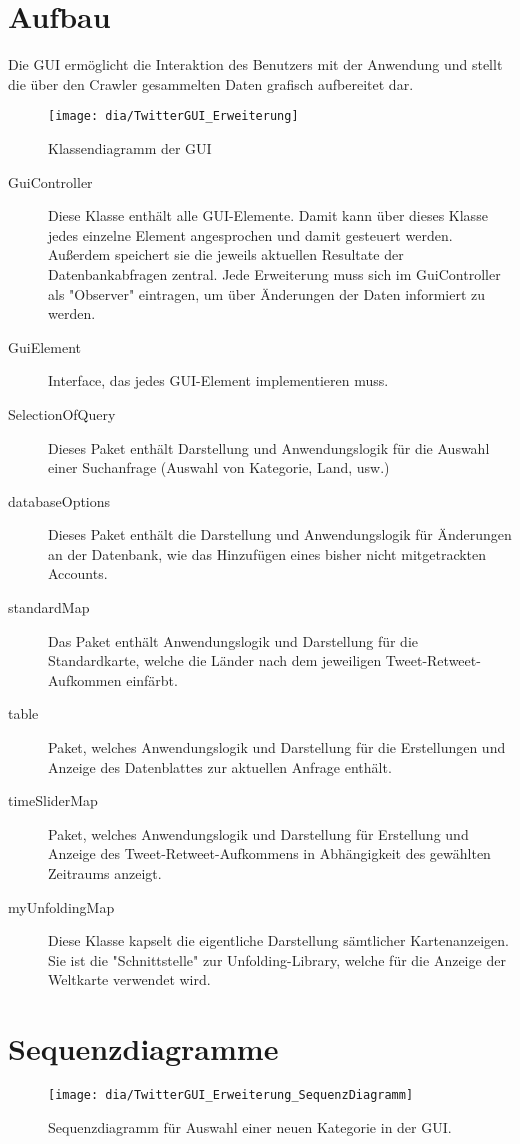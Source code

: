 \section{Aufbau}
Die GUI ermöglicht die Interaktion des Benutzers mit der Anwendung und stellt die über den Crawler gesammelten Daten grafisch aufbereitet dar. 
\begin{figure}[h!]
	\centering
	\texttt{[image: dia/TwitterGUI\_Erweiterung]}
	\caption{Klassendiagramm der GUI}
	\label{fig:GUI}
\end{figure}
\begin{description}
	\item[GuiController] Diese Klasse enthält alle GUI-Elemente. Damit kann über dieses Klasse jedes einzelne Element angesprochen und damit gesteuert werden. Außerdem speichert sie die jeweils aktuellen Resultate der Datenbankabfragen zentral. Jede Erweiterung muss sich im GuiController als "Observer" eintragen, um über Änderungen der Daten informiert zu werden. 
	\item[GuiElement] Interface, das jedes GUI-Element implementieren muss.
	\item [SelectionOfQuery] Dieses Paket enthält Darstellung und Anwendungslogik für die Auswahl einer Suchanfrage (Auswahl von Kategorie, Land, usw.)
	\item[databaseOptions] Dieses Paket enthält die Darstellung und Anwendungslogik für Änderungen an der Datenbank, wie das Hinzufügen eines bisher nicht mitgetrackten Accounts.
	
	\item [standardMap] Das Paket enthält Anwendungslogik und Darstellung für die Standardkarte, welche die Länder nach dem jeweiligen Tweet-Retweet-Aufkommen einfärbt.
	\item [table] Paket, welches Anwendungslogik und Darstellung für die Erstellungen und Anzeige des Datenblattes zur aktuellen Anfrage enthält.
	\item [timeSliderMap] Paket, welches Anwendungslogik und Darstellung für Erstellung und Anzeige des Tweet-Retweet-Aufkommens in Abhängigkeit des gewählten Zeitraums anzeigt.
	\item [myUnfoldingMap] Diese Klasse kapselt die eigentliche Darstellung sämtlicher Kartenanzeigen. Sie ist die "Schnittstelle" zur Unfolding-Library, welche für die Anzeige der Weltkarte verwendet wird.
\end{description}

\section{Sequenzdiagramme}

\begin{figure}[h!]
	\centering
	\texttt{[image: dia/TwitterGUI\_Erweiterung\_SequenzDiagramm]}
	\caption{Sequenzdiagramm für Auswahl einer neuen Kategorie in der GUI.}
	\label{fig:GUISeq}
\end{figure}